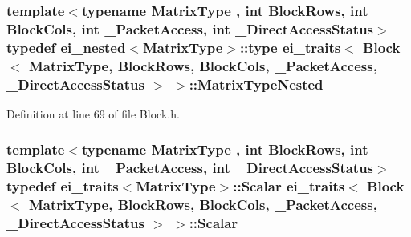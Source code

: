 \hypertarget{structei__traits_3_01_block_3_01_matrix_type_00_01_block_rows_00_01_block_cols_00_01___packet_ac479d6b4c208794fdc7c9c0ab098ad674_abcddd1698fb2bb972f5ab7b6cb260d96}{
\subsubsection[{Matrix\-Type\-Nested}]{\setlength{\rightskip}{0pt plus 5cm}template$<$typename Matrix\-Type , int Block\-Rows, int Block\-Cols, int \-\_\-\-Packet\-Access, int \-\_\-\-Direct\-Access\-Status$>$ typedef {\bf ei\-\_\-nested}$<$Matrix\-Type$>$\-::{\bf type} {\bf ei\-\_\-traits}$<$ {\bf Block}$<$ Matrix\-Type, Block\-Rows, Block\-Cols, \-\_\-\-Packet\-Access, \-\_\-\-Direct\-Access\-Status $>$ $>$\-::{\bf Matrix\-Type\-Nested}}}\label{structei__traits_3_01_block_3_01_matrix_type_00_01_block_rows_00_01_block_cols_00_01___packet_ac479d6b4c208794fdc7c9c0ab098ad674_abcddd1698fb2bb972f5ab7b6cb260d96}


Definition at line 69 of file Block.\-h.

\hypertarget{structei__traits_3_01_block_3_01_matrix_type_00_01_block_rows_00_01_block_cols_00_01___packet_ac479d6b4c208794fdc7c9c0ab098ad674_a6fb7267eaadde142b7f180ab5f194671}{
\subsubsection[{Scalar}]{\setlength{\rightskip}{0pt plus 5cm}template$<$typename Matrix\-Type , int Block\-Rows, int Block\-Cols, int \-\_\-\-Packet\-Access, int \-\_\-\-Direct\-Access\-Status$>$ typedef {\bf ei\-\_\-traits}$<$Matrix\-Type$>$\-::{\bf Scalar} {\bf ei\-\_\-traits}$<$ {\bf Block}$<$ Matrix\-Type, Block\-Rows, Block\-Cols, \-\_\-\-Packet\-Access, \-\_\-\-Direct\-Access\-Status $>$ $>$\-::{\bf Scalar}}}\label{structei__traits_3_01_block_3_01_matrix_type_00_01_block_rows_00_01_block_cols_00_01___packet_ac479d6b4c208794fdc7c9c0ab098ad674_a6fb7267eaadde142b7f180ab5f194671}


